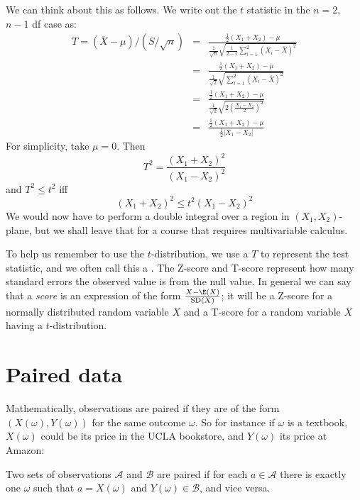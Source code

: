 We can think about this as follows. We write out the $t$ statistic in the $n=2$, $n-1$ df case as:
\begin{eqnarray*}
	T=(\overline X-\mu)/(S/\sqrt{n}) &=& \frac{\frac12(X_1+X_2)-\mu}{\frac1{\sqrt n}\sqrt{ \frac1{2-1}\sum_{i=1}^2 (X_i-\bar X)^2}}\\
	&=&\frac{\frac12(X_1+X_2)-\mu}{\frac1{\sqrt 2}\sqrt{\sum_{i=1}^2 (X_i-\bar X)^2}}\\
	&=&\frac{\frac12(X_1+X_2)-\mu}{\frac1{\sqrt 2}\sqrt{2(\frac{X_1-X_2}2)^2}}\\
	&=& \frac{\frac12(X_1+X_2)-\mu}{\frac12 |X_1-X_2|}
\end{eqnarray*}
For simplicity, take $\mu=0$. Then
\[
	T^2 = \frac{(X_1+X_2)^2}{(X_1-X_2)^2}
\]
and $T^2\le t^2$ iff
\[
	(X_1+X_2)^2\le t^2(X_1-X_2)^2
\]
We would now have to perform a double integral over a region in $(X_1,X_2)$-plane, but we shall leave that for a course that requires multivariable calculus.

\label{oneSampleTTests}


\begin{termBox}{
To help us remember to use the $t$-distribution, we use a $T$ to represent the test statistic, and we often call this a . The Z-score and T-score represent how many standard errors the observed value is from the null value. In general we can say that a \emph{score} is an expression of the form $\frac{X-\E(X)}{\mathrm{SD}(X)}$; it will be a Z-score for a normally distributed random variable $X$ and a T-score for a random variable $X$ having a $t$-distribution.}
\end{termBox}


\section{Paired data}
\label{pairedData}



Mathematically, observations are paired if they are of the form $(X(\omega),Y(\omega))$ for the same outcome $\omega$. So for instance if $\omega$ is a textbook, $X(\omega)$ could be its price in the UCLA bookstore, and $Y(\omega)$ its price at Amazon:
\begin{df}
Two sets of observations $\mathcal A$ and $\mathcal B$ are paired if for each $a\in\mathcal A$ there is exactly one $\omega$ such that $a=X(\omega)$ and $Y(\omega)\in \mathcal B$, and vice versa.
\end{df}

